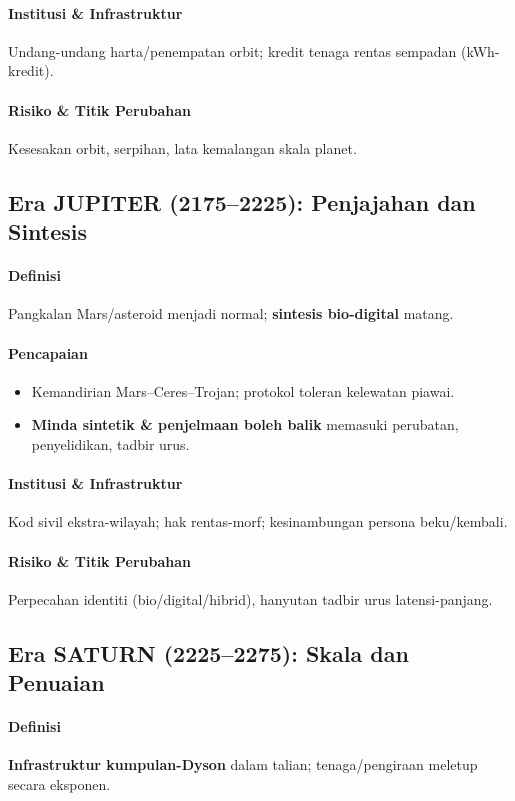 \documentclass[11pt]{article}
\begin{document}
\paragraph{Institusi \& Infrastruktur} Undang-undang harta/penempatan orbit; kredit tenaga rentas sempadan (kWh-kredit).

\paragraph{Risiko \& Titik Perubahan} Kesesakan orbit, serpihan, lata kemalangan skala planet.

\subsection{Era JUPITER (2175–2225): Penjajahan dan Sintesis}
\paragraph{Definisi} Pangkalan Mars/asteroid menjadi normal; \textbf{sintesis bio-digital} matang.

\paragraph{Pencapaian}
\begin{itemize}[noitemsep]
  \item Kemandirian Mars–Ceres–Trojan; protokol toleran kelewatan piawai.
  \item \textbf{Minda sintetik \& penjelmaan boleh balik} memasuki perubatan, penyelidikan, tadbir urus.
\end{itemize}

\paragraph{Institusi \& Infrastruktur} Kod sivil ekstra-wilayah; hak rentas-morf; kesinambungan persona beku/kembali.

\paragraph{Risiko \& Titik Perubahan} Perpecahan identiti (bio/digital/hibrid), hanyutan tadbir urus latensi-panjang.

\subsection{Era SATURN (2225–2275): Skala dan Penuaian}
\paragraph{Definisi} \textbf{Infrastruktur kumpulan-Dyson} dalam talian; tenaga/pengiraan meletup secara eksponen.
\end{document}
